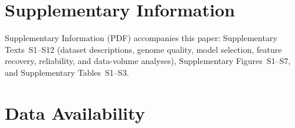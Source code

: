 \begin{refsection}




\thispagestyle{empty}

  \linenumbers
  \setlength\linenumbersep{15pt}
  \renewcommand\linenumberfont{\normalfont\footnotesize\sffamily\color{gray}}
  \modulolinenumbers[1]




\doublespacing













\section*{Supplementary Information}

Supplementary Information (PDF) accompanies this paper: Supplementary Texts~S1--S12 (dataset descriptions, genome quality, model selection, feature recovery, reliability, and data-volume analyses), Supplementary Figures~S1--S7, and Supplementary Tables~S1--S3.

\section*{Data Availability}


\end{refsection}
